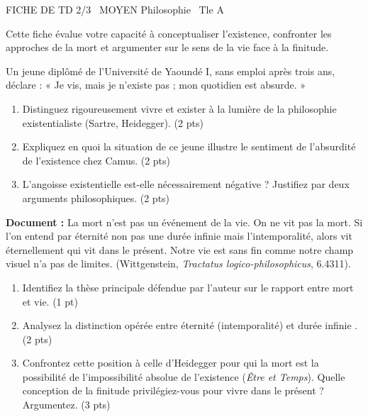 \documentclass[11pt]{article}
\begin{document}
\begin{tcolorbox}[enhanced,colback=popink,colframe=popink,arc=10pt,boxrule=0pt,left=12pt,right=12pt,top=9pt,bottom=9pt]
{\color{white}\popxbold\small FICHE DE TD 2/3 \textbullet\ MOYEN \hfill Philosophie \textbullet\ Tle A\par}
\end{tcolorbox}
\vspace{4pt}
Cette fiche évalue votre capacité à conceptualiser l'existence, confronter les approches de la mort et argumenter sur le sens de la vie face à la finitude.

\begin{exercice}
Un jeune diplômé de l'Université de Yaoundé I, sans emploi après trois ans, déclare : « Je vis, mais je n'existe pas ; mon quotidien est absurde. »
\begin{enumerate}
    \item Distinguez rigoureusement \og vivre \fg{} et \og exister \fg{} à la lumière de la philosophie existentialiste (Sartre, Heidegger). \hfill (2 pts)
    \item Expliquez en quoi la situation de ce jeune illustre le sentiment de l'\og absurdité de l'existence \fg{} chez Camus. \hfill (2 pts)
    \item L'angoisse existentielle est-elle nécessairement négative ? Justifiez par deux arguments philosophiques. \hfill (2 pts)
\end{enumerate}
\end{exercice}

\begin{exercice}
\textbf{Document :} \og La mort n'est pas un événement de la vie. On ne vit pas la mort. Si l'on entend par éternité non pas une durée infinie mais l'intemporalité, alors vit éternellement qui vit dans le présent. Notre vie est sans fin comme notre champ visuel n'a pas de limites. \fg{} (Wittgenstein, \textit{Tractatus logico-philosophicus}, 6.4311).
\begin{enumerate}
    \item Identifiez la thèse principale défendue par l'auteur sur le rapport entre mort et vie. \hfill (1 pt)
    \item Analysez la distinction opérée entre \og éternité \fg{} (intemporalité) et \og durée infinie \fg{}. \hfill (2 pts)
    \item Confrontez cette position à celle d'Heidegger pour qui la mort est \og la possibilité de l'impossibilité absolue de l'existence \fg{} (\textit{Être et Temps}). Quelle conception de la finitude privilégiez-vous pour \og vivre dans le présent \fg{} ? Argumentez. \hfill (3 pts)
\end{enumerate}
\end{exercice}
\end{document}
